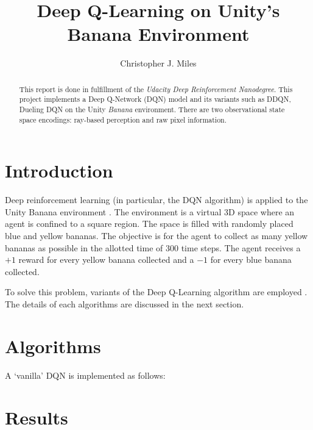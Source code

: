 \documentclass[12]{article}
\begin{document}
\title{Deep Q-Learning on Unity's Banana Environment}
\author{Christopher J. Miles}
\maketitle

\begin{abstract}
This report is done in fulfillment of the {\it Udacity Deep Reinforcement Nanodegree}. This project implements a Deep Q-Network (DQN) model and its variants such as DDQN, Dueling DQN on the Unity {\it Banana} environment. There are two observational state space encodings: ray-based perception and raw pixel information.
\end{abstract}




\section{Introduction}

Deep reinforcement learning (in particular, the DQN algorithm) is applied to the Unity Banana environment \cite{unity}.  The environment is a virtual 3D space where an agent is confined to a square region. The space is filled with randomly placed blue and yellow bananas. The objective is for the agent to collect as many yellow bananas as possible in the allotted time of 300 time steps. The agent receives a $+1$ reward for every yellow banana collected and a $-1$ for every blue banana collected. 

To solve this problem, variants of the Deep Q-Learning algorithm are employed \cite{Wang2016,Schaul2016,Mnih2015}. The details of each algorithms are discussed in the next section.

\section{Algorithms}

A `vanilla' DQN \cite{Mnih2015} is implemented as follows:

\section{Results}



\end{document}

